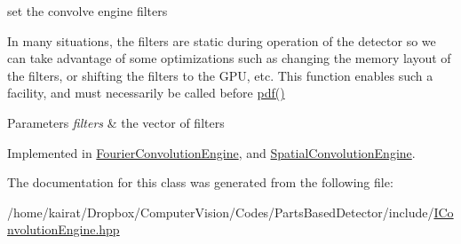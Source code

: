 set the convolve engine filters 

In many situations, the filters are static during operation of the detector so we can take advantage of some optimizations such as changing the memory layout of the filters, or shifting the filters to the G\+P\+U, etc. This function enables such a facility, and must necessarily be called before \hyperlink{classIConvolutionEngine_ab5aaabb634629a714d397a6c1a9c9400}{pdf()}


\begin{DoxyParams}{Parameters}
{\em filters} & the vector of filters \\
\hline
\end{DoxyParams}


Implemented in \hyperlink{classFourierConvolutionEngine_ad895979797d38a7c97e8dfcca9571fd2}{Fourier\+Convolution\+Engine}, and \hyperlink{classSpatialConvolutionEngine_ad27aad7b65dfa3ec6a617eed96c01d9c}{Spatial\+Convolution\+Engine}.



The documentation for this class was generated from the following file\+:\begin{DoxyCompactItemize}
\item 
/home/kairat/\+Dropbox/\+Computer\+Vision/\+Codes/\+Parts\+Based\+Detector/include/\hyperlink{IConvolutionEngine_8hpp}{I\+Convolution\+Engine.\+hpp}\end{DoxyCompactItemize}
